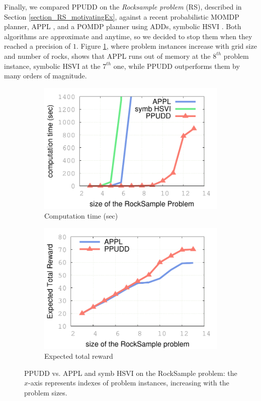 Finally, we compared PPUDD on the \textit{Rocksample problem} (RS),
described in Section \ref{section_RS_motivatingEx}, 
against a recent probabilistic MOMDP planner, 
APPL \cite{OngShaoHsuWee-IJRR10}, and a POMDP
planner using ADDs, symbolic HSVI \cite{Sim:2008:SHS:1620163.1620241}. Both
algorithms are approximate and anytime, so we  decided to stop them when they
reached a precision of $1$. 
Figure \ref{figureRS1}, where problem instances
increase with grid size and number of rocks, shows that APPL runs out of memory
at the $8^{th}$ problem instance, symbolic HSVI at the $7^{th}$ one, while PPUDD
outperforms them by many orders of magnitude. 
\begin{figure}\centering
\begin{subfigure}[c]{.48\linewidth}
\includegraphics[width=\linewidth]{RockSampleCompTime.pdf}
\caption{Computation time (sec)}
\label{figureRS1}
\end{subfigure}
\begin{subfigure}[c]{.48\linewidth}
\includegraphics[width=\linewidth]{courbePerfTime.pdf}
\caption{Expected total reward}
\label{figureRS2}
\end{subfigure}
\vspace{0.5cm}
\caption[PPUDD vs. APPL and symb-HSVI, RockSample problem]{PPUDD vs. APPL and symb HSVI on the RockSample problem: the $x$-axis represents indexes of problem instances, increasing with the problem sizes.}
\end{figure}
